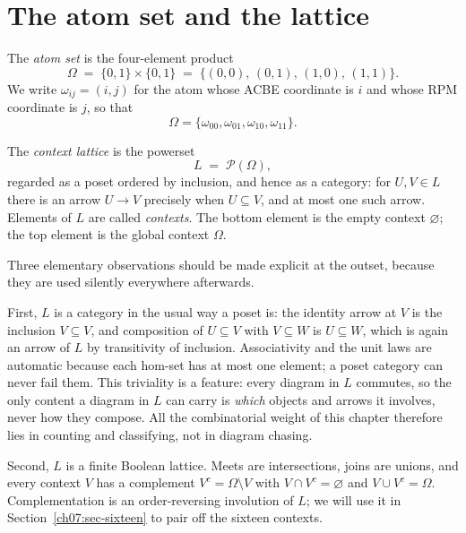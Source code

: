 \section{The atom set and the lattice}\label{ch07:sec-lattice}

\begin{definition}\label{ch07:def-omega}
The \emph{atom set} is the four-element product
\[
\Omega \;=\; \{0,1\}\times\{0,1\} \;=\; \{(0,0),\,(0,1),\,(1,0),\,(1,1)\}.
\]
We write $\omega_{ij}=(i,j)$ for the atom whose ACBE coordinate is $i$ and whose RPM coordinate is $j$, so that
\[
\Omega=\{\omega_{00},\omega_{01},\omega_{10},\omega_{11}\}.
\]
\end{definition}

\begin{definition}\label{ch07:def-lattice}
The \emph{context lattice} is the powerset
\[
L \;=\; \mathcal{P}(\Omega),
\]
regarded as a poset ordered by inclusion, and hence as a category: for $U,V\in L$ there is an arrow $U\to V$ precisely when $U\subseteq V$, and at most one such arrow. Elements of $L$ are called \emph{contexts}. The bottom element is the empty context $\varnothing$; the top element is the global context $\Omega$.
\end{definition}

Three elementary observations should be made explicit at the outset, because they are used silently everywhere afterwards.

First, $L$ is a category in the usual way a poset is: the identity arrow at $V$ is the inclusion $V\subseteq V$, and composition of $U\subseteq V$ with $V\subseteq W$ is $U\subseteq W$, which is again an arrow of $L$ by transitivity of inclusion. Associativity and the unit laws are automatic because each hom-set has at most one element; a poset category can never fail them. This triviality is a feature: every diagram in $L$ commutes, so the only content a diagram in $L$ can carry is \emph{which} objects and arrows it involves, never how they compose. All the combinatorial weight of this chapter therefore lies in counting and classifying, not in diagram chasing.

Second, $L$ is a finite Boolean lattice. Meets are intersections, joins are unions, and every context $V$ has a complement $V^{c}=\Omega\setminus V$ with $V\cap V^{c}=\varnothing$ and $V\cup V^{c}=\Omega$. Complementation is an order-reversing involution of $L$; we will use it in Section~\ref{ch07:sec-sixteen} to pair off the sixteen contexts.

